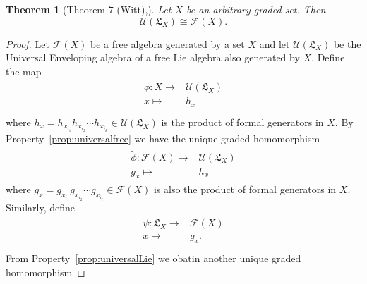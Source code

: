 \documentclass[11pt]{amsart}
\newtheorem{thm}{Theorem}
\theoremstyle{definition}
\numberwithin{equation}{section}
\begin{document}
\begin{thm}[Theorem $7$ (Witt),\cite{jacobson2013lie}]
Let $X$ be an arbitrary graded set.  Then
\[
\mathcal{U}(\mathfrak{L}_{X}) \cong \mathcal{F}(X).
\]
%
%
%
\end{thm}
\begin{proof}
    Let \(\mathcal{F}(X)\) be a free algebra generated by a set \(X\) and let \( \mathcal{U} (\mathfrak{L}_{X})\) be the Universal Enveloping algebra of a free Lie algebra also generated by \(X\). 
    Define the map 
    \begin{align*}
        \begin{array}{rcl}
            \phi :  X \longrightarrow & \mathcal{U} (\mathfrak{L}_{X}) \\
             x  \longmapsto  & h_x \\ 
        \end{array}
    \end{align*}
    where \(h_x =  h_{x_{i_{1}} }h_{x_{i_{2}} }\cdots h_{x_{i_{k}} } \in \mathcal{U} (\mathfrak{L}_{X})\) is the product of formal generators in \(X\). 
    By Property~\ref{prop:universalfree} we have the unique graded homomorphism 
    \begin{align*}
        \begin{array}{rcl}
            \tilde{\phi}: \mathcal{F}(X) \longrightarrow & \mathcal{U} (\mathfrak{L}_{X}) \\
            g_x \longmapsto & h_x
        \end{array}
    \end{align*}
    where \(g_x = g_{x_{i_{1}} }g_{x_{i_{2}} }\cdots g_{x_{i_{\ell}} } \in \mathcal{F}(X)\) is also the product of formal generators in \(X\). Similarly, 
    define 
    \begin{align*}
        \begin{array}{rcl}
            \psi :  \mathfrak{L}_{X} \longrightarrow &\mathcal{F}(X) \\
        x  \longmapsto  & g_x .\\
        \end{array}
    \end{align*}
    From Property~\ref{prop:universalLie} we obatin another unique graded homomorphism 

\end{proof}
\end{document}
